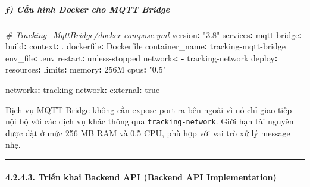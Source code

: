 \documentclass[13pt,a4paper]{extarticle}
\newenvironment{Shaded}{}{}
\newcommand{\AttributeTok}[1]{\textcolor[rgb]{0.49,0.56,0.16}{#1}}
\newcommand{\CharTok}[1]{\textcolor[rgb]{0.25,0.44,0.63}{#1}}
\newcommand{\CommentTok}[1]{\textcolor[rgb]{0.38,0.63,0.69}{\textit{#1}}}
\newcommand{\FunctionTok}[1]{\textcolor[rgb]{0.02,0.16,0.49}{#1}}
\newcommand{\KeywordTok}[1]{\textcolor[rgb]{0.00,0.44,0.13}{\textbf{#1}}}
\newcommand{\StringTok}[1]{\textcolor[rgb]{0.25,0.44,0.63}{#1}}
\renewcommand{\\}{\thesislongtableorignewline\hline}%
\begin{document}
\subparagraph{f) Cấu hình Docker cho MQTT
Bridge}\label{f-cux1ea5u-huxecnh-docker-cho-mqtt-bridge}

\begin{Shaded}
\begin{Highlighting}[]
\CommentTok{\# Tracking\_MqttBridge/docker{-}compose.yml}
\FunctionTok{version}\KeywordTok{:}\AttributeTok{ }\StringTok{"3.8"}
\FunctionTok{services}\KeywordTok{:}
\AttributeTok{  }\FunctionTok{mqtt{-}bridge}\KeywordTok{:}
\AttributeTok{    }\FunctionTok{build}\KeywordTok{:}
\AttributeTok{      }\FunctionTok{context}\KeywordTok{:}\AttributeTok{ .}
\AttributeTok{      }\FunctionTok{dockerfile}\KeywordTok{:}\AttributeTok{ Dockerfile}
\AttributeTok{    }\FunctionTok{container\_name}\KeywordTok{:}\AttributeTok{ tracking{-}mqtt{-}bridge}
\AttributeTok{    }\FunctionTok{env\_file}\KeywordTok{:}\AttributeTok{ .env}
\AttributeTok{    }\FunctionTok{restart}\KeywordTok{:}\AttributeTok{ unless{-}stopped}
\AttributeTok{    }\FunctionTok{networks}\KeywordTok{:}
\AttributeTok{      }\KeywordTok{{-}}\AttributeTok{ tracking{-}network}
\AttributeTok{    }\FunctionTok{deploy}\KeywordTok{:}
\AttributeTok{      }\FunctionTok{resources}\KeywordTok{:}
\AttributeTok{        }\FunctionTok{limits}\KeywordTok{:}
\AttributeTok{          }\FunctionTok{memory}\KeywordTok{:}\AttributeTok{ 256M}
\AttributeTok{          }\FunctionTok{cpus}\KeywordTok{:}\AttributeTok{ }\StringTok{"0.5"}

\FunctionTok{networks}\KeywordTok{:}
\AttributeTok{  }\FunctionTok{tracking{-}network}\KeywordTok{:}
\AttributeTok{    }\FunctionTok{external}\KeywordTok{:}\AttributeTok{ }\CharTok{true}
\end{Highlighting}
\end{Shaded}

Dịch vụ MQTT Bridge không cần expose port ra bên ngoài vì nó chỉ giao
tiếp nội bộ với các dịch vụ khác thông qua \texttt{tracking-network}.
Giới hạn tài nguyên được đặt ở mức 256 MB RAM và 0.5 CPU, phù hợp với
vai trò xử lý message nhẹ.

\begin{center}\rule{0.5\linewidth}{0.5pt}\end{center}

\paragraph{4.2.4.3. Triển khai Backend API (Backend API
Implementation)}\label{4243-triux1ec3n-khai-backend-api-backend-api-implementation}
\end{document}
